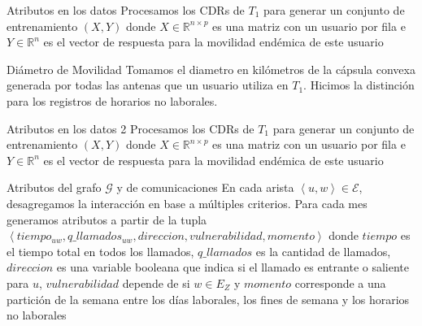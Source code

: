 \documentclass[xcolor=x11names]{beamer}
\def\calE{\mathcal{E}}
\def\calG{\mathcal{G}}
\begin{document}

\begin{frame}{Atributos en los datos}
	Procesamos los CDRs de $T_1$ para generar un conjunto de entrenamiento $(X,Y)$ donde $X \in \mathbb{R}^{n \times p}$ es una matriz con un usuario por fila e $Y \in \mathbb{R}^n$ es el vector de respuesta para la movilidad endémica de este usuario

	\bigskip

	\begin{block}{Diámetro de Movilidad}
		Tomamos el diametro en kilómetros de la cápsula convexa generada por todas las antenas que un usuario utiliza en $T_1$. Hicimos la distinción para los registros de horarios no laborales.
	\end{block}

\end{frame}

\begin{frame}{Atributos en los datos 2}
	Procesamos los CDRs de $T_1$ para generar un conjunto de entrenamiento $(X,Y)$ donde $X \in \mathbb{R}^{n \times p}$ es una matriz con un usuario por fila e $Y \in \mathbb{R}^n$ es el vector de respuesta para la movilidad endémica de este usuario

	\bigskip

	\begin{block}{Atributos del grafo $\calG$ y de comunicaciones}
		En cada arista $\left< u, w \right> \in \calE$, desagregamos la interacción en base a múltiples criterios. Para cada mes generamos atributos a partir de la tupla  $\left< tiempo_{uw}, q\_llamados_{uw}, direcci on, vulnerabilidad, momento \right>$ donde $tiempo$ es el tiempo total en todos los llamados, $q\_llamados$ es la cantidad de llamados, $direccion$ es una variable booleana que indica si el llamado es entrante o saliente para $u$, $vulnerabilidad$ depende de si $w \in E_Z$ y $momento$ corresponde a una partición de la semana entre los días laborales, los fines de semana y los horarios no laborales
	\end{block}

\end{frame}
\end{document}
